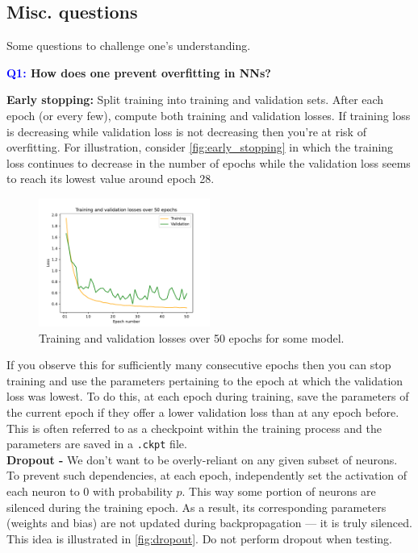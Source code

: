 \documentclass[11pt]{article}
\begin{document}
\subsection{Misc. questions}

Some questions to challenge one's understanding.

\begin{center}
    \textbf{\textcolor{blue}{Q1:} How does one prevent overfitting in NNs?}
\end{center}
\textbf{Early stopping:} Split training into training and validation sets. After each epoch (or every few), compute both training and validation losses. If training loss is decreasing while validation loss is not decreasing then you're at risk of overfitting. For illustration, consider \autoref{fig:early_stopping} in which the training loss continues to decrease in the number of epochs while the validation loss seems to reach its lowest value around epoch 28.

\begin{figure}[ht]
    \centering
    \includegraphics[width=0.5\textwidth]{./figures/neural_nets/REG_early_stopping.pdf}
    \caption{Training and validation losses over 50 epochs for some model.}
    \label{fig:early_stopping}
\end{figure}

\noindent If you observe this for sufficiently many consecutive epochs then you can stop training and use the parameters pertaining to the epoch at which the validation loss was lowest. To do this, at each epoch during training, save the parameters of the current epoch if they offer a lower validation loss than at any epoch before. This is often referred to as a checkpoint within the training process and the parameters are saved in a \texttt{.ckpt} file.\\

\noindent\textbf{Dropout -} We don't want to be overly-reliant on any given subset of neurons. To prevent such dependencies, at each epoch, independently set the activation of each neuron to 0 with probability $p$. This way some portion of neurons are silenced during the training epoch. As a result, its corresponding parameters (weights and bias) are not updated during backpropagation — it is truly silenced. This idea is illustrated in \autoref{fig:dropout}. Do not perform dropout when testing.
\end{document}
